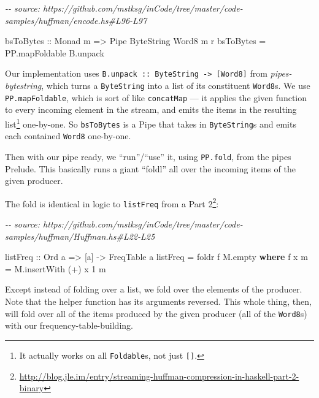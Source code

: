 \documentclass[]{article}
\newenvironment{Shaded}{}{}
\newcommand{\CommentTok}[1]{\textcolor[rgb]{0.38,0.63,0.69}{\textit{#1}}}
\newcommand{\DataTypeTok}[1]{\textcolor[rgb]{0.56,0.13,0.00}{#1}}
\newcommand{\DecValTok}[1]{\textcolor[rgb]{0.25,0.63,0.44}{#1}}
\newcommand{\FunctionTok}[1]{\textcolor[rgb]{0.02,0.16,0.49}{#1}}
\newcommand{\KeywordTok}[1]{\textcolor[rgb]{0.00,0.44,0.13}{\textbf{#1}}}
\newcommand{\NormalTok}[1]{#1}
\newcommand{\OperatorTok}[1]{\textcolor[rgb]{0.40,0.40,0.40}{#1}}
\newcommand{\OtherTok}[1]{\textcolor[rgb]{0.00,0.44,0.13}{#1}}
\renewcommand{\href}[2]{#2\footnote{\url{#1}}}
\begin{document}
\begin{Shaded}
\begin{Highlighting}[]
\CommentTok{{-}{-} source: https://github.com/mstksg/inCode/tree/master/code{-}samples/huffman/encode.hs\#L96{-}L97}

\OtherTok{bsToBytes ::} \DataTypeTok{Monad}\NormalTok{ m }\OtherTok{=>} \DataTypeTok{Pipe} \DataTypeTok{ByteString} \DataTypeTok{Word8}\NormalTok{ m r}
\NormalTok{bsToBytes }\OtherTok{=}\NormalTok{ PP.mapFoldable B.unpack}
\end{Highlighting}
\end{Shaded}

Our implementation uses
\texttt{B.unpack\ ::\ ByteString\ -\textgreater{}\ {[}Word8{]}} from
\emph{pipes-bytestring}, which turns a \texttt{ByteString} into a list of its
constituent \texttt{Word8}s. We use \texttt{PP.mapFoldable}, which is sort of
like \texttt{concatMap} --- it applies the given function to every incoming
element in the stream, and emits the items in the resulting list\footnote{It
  actually works on all \texttt{Foldable}s, not just \texttt{{[}{]}}.}
one-by-one. So \texttt{bsToBytes} is a Pipe that takes in \texttt{ByteString}s
and emits each contained \texttt{Word8} one-by-one.

Then with our pipe ready, we ``run''/``use'' it, using \texttt{PP.fold}, from
the pipes Prelude. This basically runs a giant ``foldl'' all over the incoming
items of the given producer.

The fold is identical in logic to \texttt{listFreq} from a
\href{http://blog.jle.im/entry/streaming-huffman-compression-in-haskell-part-2-binary}{Part
2}:

\begin{Shaded}
\begin{Highlighting}[]
\CommentTok{{-}{-} source: https://github.com/mstksg/inCode/tree/master/code{-}samples/huffman/Huffman.hs\#L22{-}L25}

\OtherTok{listFreq ::} \DataTypeTok{Ord}\NormalTok{ a }\OtherTok{=>}\NormalTok{ [a] }\OtherTok{{-}>} \DataTypeTok{FreqTable}\NormalTok{ a}
\NormalTok{listFreq }\OtherTok{=} \FunctionTok{foldr}\NormalTok{ f M.empty}
  \KeywordTok{where}
\NormalTok{    f x m }\OtherTok{=}\NormalTok{ M.insertWith (}\OperatorTok{+}\NormalTok{) x }\DecValTok{1}\NormalTok{ m}
\end{Highlighting}
\end{Shaded}

Except instead of folding over a list, we fold over the elements of the
producer. Note that the helper function has its arguments reversed. This whole
thing, then, will fold over all of the items produced by the given producer (all
of the \texttt{Word8}s) with our frequency-table-building.
\end{document}
